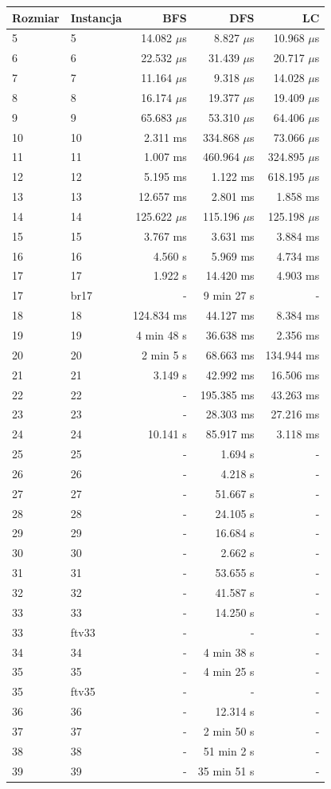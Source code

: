 \begin{tabular}{l l r r r}
\toprule
Rozmiar & Instancja & BFS & DFS & LC \\
\midrule
5 & 5 & 14.082 $\mu$s & 8.827 $\mu$s & 10.968 $\mu$s \\
6 & 6 & 22.532 $\mu$s & 31.439 $\mu$s & 20.717 $\mu$s \\
7 & 7 & 11.164 $\mu$s & 9.318 $\mu$s & 14.028 $\mu$s \\
8 & 8 & 16.174 $\mu$s & 19.377 $\mu$s & 19.409 $\mu$s \\
9 & 9 & 65.683 $\mu$s & 53.310 $\mu$s & 64.406 $\mu$s \\
10 & 10 & 2.311 ms & 334.868 $\mu$s & 73.066 $\mu$s \\
11 & 11 & 1.007 ms & 460.964 $\mu$s & 324.895 $\mu$s \\
12 & 12 & 5.195 ms & 1.122 ms & 618.195 $\mu$s \\
13 & 13 & 12.657 ms & 2.801 ms & 1.858 ms \\
14 & 14 & 125.622 $\mu$s & 115.196 $\mu$s & 125.198 $\mu$s \\
15 & 15 & 3.767 ms & 3.631 ms & 3.884 ms \\
16 & 16 & 4.560 s & 5.969 ms & 4.734 ms \\
17 & 17 & 1.922 s & 14.420 ms & 4.903 ms \\
17 & br17 & - & 9 min 27 s & - \\
18 & 18 & 124.834 ms & 44.127 ms & 8.384 ms \\
19 & 19 & 4 min 48 s & 36.638 ms & 2.356 ms \\
20 & 20 & 2 min 5 s & 68.663 ms & 134.944 ms \\
21 & 21 & 3.149 s & 42.992 ms & 16.506 ms \\
22 & 22 & - & 195.385 ms & 43.263 ms \\
23 & 23 & - & 28.303 ms & 27.216 ms \\
24 & 24 & 10.141 s & 85.917 ms & 3.118 ms \\
25 & 25 & - & 1.694 s & - \\
26 & 26 & - & 4.218 s & - \\
27 & 27 & - & 51.667 s & - \\
28 & 28 & - & 24.105 s & - \\
29 & 29 & - & 16.684 s & - \\
30 & 30 & - & 2.662 s & - \\
31 & 31 & - & 53.655 s & - \\
32 & 32 & - & 41.587 s & - \\
33 & 33 & - & 14.250 s & - \\
33 & ftv33 & - & - & - \\
34 & 34 & - & 4 min 38 s & - \\
35 & 35 & - & 4 min 25 s & - \\
35 & ftv35 & - & - & - \\
36 & 36 & - & 12.314 s & - \\
37 & 37 & - & 2 min 50 s & - \\
38 & 38 & - & 51 min 2 s & - \\
39 & 39 & - & 35 min 51 s & - \\
\bottomrule
\end{tabular}
